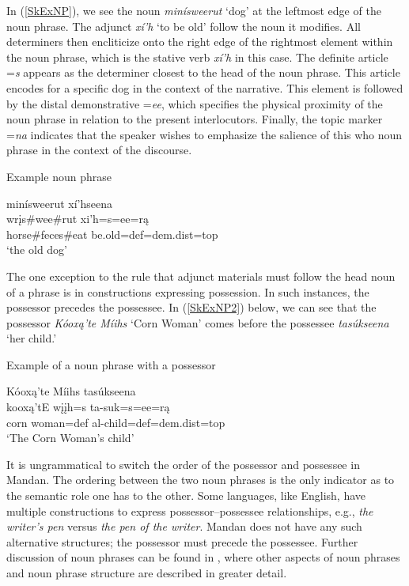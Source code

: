 In (\ref{SkExNP}), we see the noun \textit{minísweerut} `dog' at the leftmost edge of the noun phrase. The adjunct \textit{xí'h} `to be old' follow the noun it modifies. All determiners then encliticize onto the right edge of the rightmost element within the noun phrase, which is the stative verb \textit{xí'h} in this case. The definite article =\textit{s} appears as the determiner closest to the head of the noun phrase. This article encodes for a specific dog in the context of the narrative. This element is followed by the distal  demonstrative =\textit{ee},  which specifies the physical proximity of the noun phrase in relation to the present interlocutors. Finally, the topic marker =\textit{na} indicates that the speaker wishes to emphasize the salience of this who noun phrase in the context of the discourse.

\begin{exe}
    \item\label{SkExNP} Example noun phrase

    \glll minísweerut xí'hseena\\
    wrįs\#wee\#rut xi'h=s=ee=rą\\
    \textnormal{horse}\#\textnormal{feces}\#\textnormal{eat} \textnormal{be.old}=def=dem.dist=top\\
    \glt `the old dog' \citep[189]{hollow1973a}
\end{exe}

The one exception to the rule that adjunct materials must follow the head noun of a phrase is in constructions expressing possession. In such instances, the possessor precedes the possessee. In (\ref{SkExNP2}) below, we can see that the possessor \textit{Kóoxą'te Míihs} `Corn Woman' comes before the possessee \textit{tasúkseena} `her child.'

\begin{exe}
    \item\label{SkExNP2} Example of a noun phrase with a possessor

    \glll Kóoxą'te Míihs tasúkseena\\
    kooxą'tE wįįh=s ta-suk=s=ee=rą\\
    \textnormal{corn} \textnormal{woman}=def al-\textnormal{child}=def=dem.dist=top\\
    \glt `The Corn Woman's child' \citep[112]{hollow1973a}
    
\end{exe}

It is ungrammatical to switch the order of the possessor and possessee in Mandan. The ordering between the two noun phrases is the only indicator as to the semantic role one has to the other. Some languages, like English, have multiple constructions to express possessor--possessee relationships, e.g., \textit{the writer's pen} versus \textit{the pen of the writer}. Mandan does not have any such alternative structures; the possessor must precede the possessee. Further discussion of noun phrases can be found in , where other aspects of noun phrases and noun phrase structure are described in greater detail.

